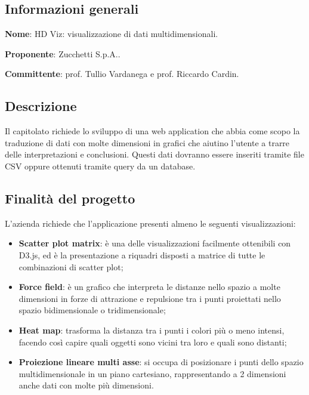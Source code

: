\documentclass[../studio-di-fattibilita.tex]{subfiles}
\begin{document}
\subsection{Informazioni generali}%
\label{sub:informazioni_generale}
\begin{description}
  \item \textbf{Nome}: HD Viz: visualizzazione di dati multidimensionali.
  \item \textbf{Proponente}: Zucchetti S.p.A..
  \item \textbf{Committente}: prof. Tullio Vardanega e prof. Riccardo Cardin.
\end{description}

\subsection{Descrizione}%
\label{sub:descrizione}
Il capitolato richiede lo sviluppo di una web application che abbia come scopo la 
traduzione di dati con molte dimensioni in grafici che aiutino l’utente a trarre delle interpretazioni e conclusioni. Questi dati dovranno essere inseriti tramite file CSV oppure ottenuti tramite query da un database.

\subsection{Finalità del progetto}%
\label{sub:finalita_del_progetto}
L’azienda richiede che l’applicazione presenti almeno le seguenti visualizzazioni:
\begin{itemize}
  \item \textbf{Scatter plot matrix}: è una delle visualizzazioni facilmente ottenibili con D3.js, ed è la presentazione a riquadri disposti a matrice di tutte le combinazioni di scatter plot;
  \item \textbf{Force field}: è un grafico che interpreta le distanze nello spazio a molte dimensioni in forze di attrazione e repulsione tra i punti proiettati nello spazio bidimensionale o tridimensionale;
  \item \textbf{Heat map}: trasforma la distanza tra i punti i colori più o meno intensi, facendo così capire quali oggetti sono vicini tra loro e quali sono distanti;
  \item \textbf{Proiezione lineare multi asse}: si occupa di posizionare i punti dello spazio multidimensionale in un piano cartesiano, rappresentando a 2 dimensioni anche dati con molte più dimensioni. 
\end{itemize}
\end{document}

